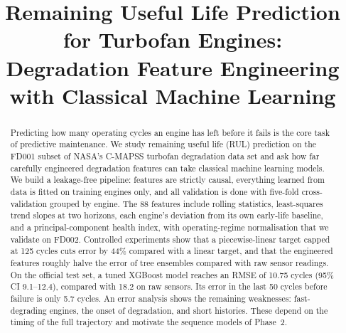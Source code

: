 \documentclass[conference]{IEEEtran}
\begin{document}
\title{Remaining Useful Life Prediction for Turbofan Engines:\\
Degradation Feature Engineering with Classical Machine Learning}

\author{
\and
{}
\and
{}
\and
{}
\and
{}
\and
{}
}

\maketitle

\begin{abstract}
Predicting how many operating cycles an engine has left before it fails is the core task of predictive maintenance. We study remaining useful life (RUL) prediction on the FD001 subset of NASA's C-MAPSS turbofan degradation data set and ask how far carefully engineered degradation features can take classical machine learning models. We build a leakage-free pipeline: features are strictly causal, everything learned from data is fitted on training engines only, and all validation is done with five-fold cross-validation grouped by engine. The 88 features include rolling statistics, least-squares trend slopes at two horizons, each engine's deviation from its own early-life baseline, and a principal-component health index, with operating-regime normalisation that we validate on FD002. Controlled experiments show that a piecewise-linear target capped at 125 cycles cuts error by 44\% compared with a linear target, and that the engineered features roughly halve the error of tree ensembles compared with raw sensor readings. On the official test set, a tuned XGBoost model reaches an RMSE of 10.75 cycles (95\% CI 9.1--12.4), compared with 18.2 on raw sensors. Its error in the last 50 cycles before failure is only 5.7 cycles. An error analysis shows the remaining weaknesses: fast-degrading engines, the onset of degradation, and short histories. These depend on the timing of the full trajectory and motivate the sequence models of Phase~2.
\end{abstract}
\end{document}
